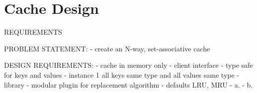 \documentclass[letterpaper,11pt]{article}
\begin{document}

\section{
 Cache Design
}


  {
			REQUIREMENTS

			PROBLEM STATEMENT:
			- create an N-way, set-associative cache


			DESIGN REQUIREMENTS:
			- cache in memory only
			- client interface
				- type safe for keys and values
				- instance 1 all keys same type and all values same type
				- library
				- modular plugin for replacement algorithm
				- defaults LRU, MRU
			- a.
			- b.
	}



\end{document}
